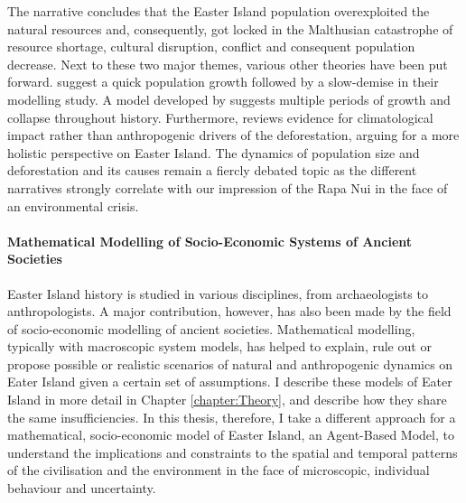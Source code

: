 The narrative concludes that the Easter Island population overexploited the natural resources and, consequently, got locked in the Malthusian catastrophe of resource shortage, cultural disruption, conflict and consequent population decrease.
Next to these two major themes, various other theories have been put forward.
\citet{Brandt2015} suggest a quick population growth followed by a slow-demise in their modelling study.
A model developed by \citet{Cole2008} suggests multiple periods of growth and collapse throughout history. 
Furthermore, \citet{Rull2016} reviews evidence for climatological impact rather than anthropogenic drivers of the deforestation, arguing for a more holistic perspective on Easter Island.
The dynamics of population size and deforestation and its causes remain a fiercly debated topic as the different narratives strongly correlate with our impression of the Rapa Nui in the face of an environmental crisis. 



\paragraph{Mathematical Modelling of Socio-Economic Systems of Ancient Societies}
Easter Island history is studied in various disciplines, from archaeologists to anthropologists. 
A major contribution, however, has also been made by the field of socio-economic modelling of ancient societies.
Mathematical modelling, typically with macroscopic system models, has helped to explain, rule out or propose possible or realistic scenarios of natural and anthropogenic dynamics on Eater Island given a certain set of assumptions.
I describe these models of Eater Island in more detail in Chapter \ref{chapter:Theory}, and describe how they share the same insufficiencies.
In this thesis, therefore, I take a different approach for a mathematical, socio-economic model of Easter Island, an Agent-Based Model, to understand the implications and constraints to the spatial and temporal patterns of the civilisation and the environment in the face of microscopic, individual behaviour and uncertainty.

